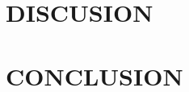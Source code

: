 \documentclass[a4paper,fleqn,spanish]{cas-dc}
\begin{document}




\section{DISCUSION}\label{discusion}



\section{CONCLUSION}\label{conclucion}





%
%

%



%
\end{document}
